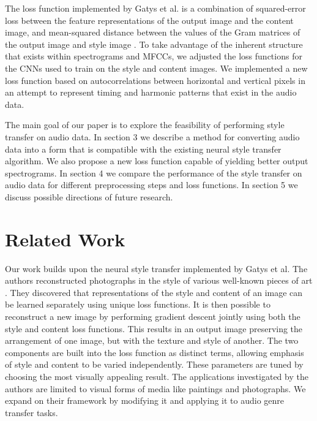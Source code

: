 \documentclass{article}
\begin{document}
The loss function implemented by Gatys et al. is a combination of squared-error loss between the feature representations of the output image and the content image, and mean-squared distance between the values of the Gram matrices of the output image and style image \citep{Gatys2015}. To take advantage of the inherent structure that exists within spectrograms and MFCCs, we adjusted the loss functions for the CNNs used to train on the style and content images. We implemented a new loss function based on autocorrelations between horizontal and vertical pixels in an attempt to represent timing and harmonic patterns that exist in the audio data.

The main goal of our paper is to explore the feasibility of performing style transfer on audio data. In section 3 we describe a method for converting audio data into a form that is compatible with the existing neural style transfer algorithm. We also propose a new loss function capable of yielding better output spectrograms. In section 4 we compare the performance of the style transfer on audio data for different preprocessing steps and loss functions. In section 5 we discuss possible directions of future research.


\section{Related Work}

Our work builds upon the neural style transfer implemented by Gatys et al. The authors reconstructed photographs in the style of various well-known pieces of art \citep{Gatys2015}. They discovered that representations of the style and content of an image can be learned separately using unique loss functions. It is then possible to reconstruct a new image by performing gradient descent jointly using both the style and content loss functions. This results in an output image preserving the arrangement of one image, but with the texture and style of another. The two components are built into the loss function as distinct terms, allowing emphasis of style and content to be varied independently. These parameters are tuned by choosing the most visually appealing result. The applications investigated by the authors are limited to visual forms of media like paintings and photographs. We expand on their framework by modifying it and applying it to audio genre transfer tasks.
\end{document}
